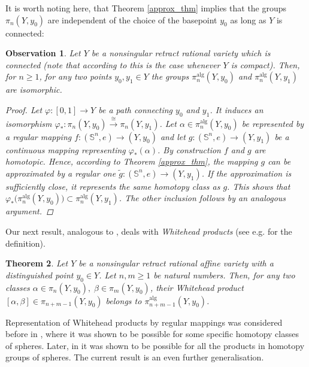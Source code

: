 \documentclass{article}
\theoremstyle{plain}
\newtheorem{thm}{Theorem}[section]
\newtheorem{obs}[thm]{Observation}
\theoremstyle{definition}
\theoremstyle{remark}
\newcommand{\s}{\mathbb{S}}
\newcommand{\alg}{\mathrm{alg}}
\begin{document}
It is worth noting here, that Theorem \ref{approx_thm} implies that the groups $\pi_n(Y,y_0)$ are independent of the choice of the basepoint $y_0$ as long as $Y$ is connected:
\begin{obs}
Let $Y$ be a nonsingular retract rational variety which is connected (note that according to \cite[Observation 6.1]{baneckiRelativeStoneWeierstrassTheorem2024} this is the case whenever $Y$ is compact). Then, for $n\geq 1$, for any two points $y_0,y_1\in Y$ the groups $\pi^\alg_n(Y,y_0)$ and $\pi^\alg_n(Y,y_1)$ are isomorphic.
\begin{proof}
Let $\varphi:[0,1]\rightarrow Y$ be a path connecting $y_0$ and $y_1$. It induces an isomorphism $\varphi_\ast:\pi_n(Y,y_0)\xrightarrow{\cong}\pi_n(Y,y_1)$. Let $\alpha\in \pi_n^\alg(Y,y_0)$ be represented by a regular mapping $f:(\s^n,e)\rightarrow (Y,y_0)$ and let $g:(\s^n,e)\rightarrow (Y,y_1)$ be a continuous mapping representing $\varphi_\ast(\alpha)$. By construction $f$ and $g$ are homotopic. Hence, according to Theorem \ref{approx_thm}, the mapping $g$ can be approximated by a regular one $\tilde{g}:(\s^n,e)\rightarrow (Y,y_1)$. If the approximation is sufficiently close, it represents the same homotopy class as $g$. This shows that $\varphi_\ast\big(\pi_n^\alg(Y,y_0)\big)\subset\pi_n^\alg(Y,y_1)$. The other inclusion follows by an analogous argument.
\end{proof}
\end{obs}




Our next result, analogous to \cite[Observation 3.7]{baneckiAlgebraicHomotopyClasses2024}, deals with \emph{Whitehead products} (see e.g. \cite[Chapter X, Section 7]{whiteheadElementsHomotopyTheory1978} for the definition).
\begin{thm}\label{thm_products}
Let $Y$ be a nonsingular retract rational affine variety with a distinguished point $y_0\in Y$. Let $n,m\geq 1$ be natural numbers. Then, for any two classes $\alpha\in \pi_n(Y,y_0),\;\beta\in \pi_m(Y,y_0)$, their Whitehead product $[\alpha,\beta]\in\pi_{n+m-1}(Y,y_0)$ belongs to $\pi_{n+m-1}^\alg(Y,y_0)$.
\end{thm}
Representation of Whitehead products by regular mappings was considered before in \cite{pengAlgebraicMapsSpheres1999}, where it was shown to be possible for some specific homotopy classes of spheres. Later, in \cite{baneckiAlgebraicHomotopyClasses2024} it was shown to be possible for all the products in homotopy groups of spheres. The current result is an even further generalisation.
\end{document}
